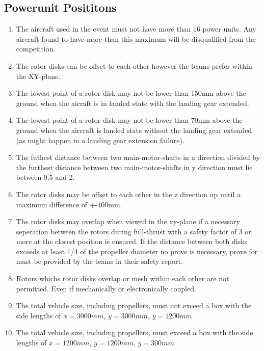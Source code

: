 \documentclass{article}
\begin{document}
\subsection{Powerunit Posititons}
\begin{enumerate}
  \item The aircraft used in the event must not have more than 16 power units. Any aircraft found to have more than this maximum will be disqualified from the competition.
  \item The rotor disks can be offset to each other however the teams prefer within the XY-plane. 
  \item The lowest point of a rotor disk may not be lower than 150mm above the ground when the aicraft is in landed state with the landing gear extended.
  \item The lowest point of a rotor disk may not be lower than 70mm above the ground when the aircraft is landed state without the landing gear extended (as might happen in a landing gear extension failure).
  \item The futhest distance between two main-motor-shafts in x direction divided by the furthest distance between two main-motor-shafts in y direction must lie between 0.5 and 2. 
  \item The rotor disks may be offset to each other in the z direction up until a maximum difference of +-400mm.
  \item The rotor disks may overlap when viewed in the xy-plane if a necessary seperation between the rotors during full-thrust with a safety factor of 3 or more at the closest position is ensured. If the distance between both disks exceeds at least 1/4 of the propeller diameter no prove is necessary, prove for must be provided by the teams in their safety report. 
  \item Rotors whichs rotor disks overlap or mesh within each other are not permitted. Even if mechanically or electronically coupled.
  \item The total vehicle size, including propellers, must not exceed a box with the side lengths of $x=3000mm$, $y=3000mm$, $y=1200mm$
  \item The total vehicle size, including propellers, must exceed a box with the side lengths of $x=1200mm$, $y=1200mm$, $y=300mm$
\end{enumerate}
\end{document}
